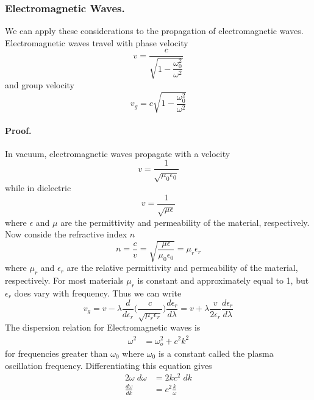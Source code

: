 \documentclass[../../../main.tex]{subfiles}
\begin{document}
\subsubsection{Electromagnetic Waves.} We can apply these considerations to the propagation of electromagnetic waves. Electromagnetic waves travel with phase velocity 
\begin{equation*}
    v=\frac{c}{\sqrt{1-\dfrac{\omega_0^2}{\omega^2}}}
\end{equation*}
and group velocity
\begin{equation*}
    v_g=c \sqrt{1-\frac{\omega_0^2}{\omega^2}}
\end{equation*}

\paragraph{Proof.} In vacuum, electromagnetic waves propagate with a velocity
\begin{equation*}
    v=\frac{1}{\sqrt{\mu_0\epsilon_0}}
\end{equation*}
while in dielectric 
\begin{equation*}
    v=\frac{1}{\sqrt{\mu\epsilon}}
\end{equation*}
where $\epsilon$ and $\mu$ are the permittivity and permeability of the material, respectively. Now conside the refractive index $n$
\begin{equation*}
    n=\frac{c}{v}=\sqrt{\frac{\mu\epsilon}{\mu_0\epsilon_0}}=\mu_r\epsilon_r
\end{equation*}
where $\mu_r$ and $\epsilon_r$ are the relative permittivity and permeability of the material, respectively. For most materials $\mu_r$ is constant and approximately equal to 1, but $\epsilon
_r$ does vary with frequency. Thus we can write 
\begin{equation*}
    v_g=v-\lambda\frac{d}{d\epsilon_r}\biggl(\frac{c}{\sqrt{\mu_r\epsilon_r}}\biggr) \frac{d\epsilon_r}{d\lambda}=v+\lambda\frac{v}{2\epsilon_r}\frac{d\epsilon_r}{d\lambda}
\end{equation*}The dispersion relation for Electromagnetic waves is 
\begin{align*}
    \omega^2&=\omega_o^2+c^2k^2
\end{align*}
for frequencies greater than $\omega_0$ where $\omega_0$ is a constant called the plasma oscillation frequency. Differentiating this equation gives
\begin{align*}
    2\omega\;d\omega&=2kc^2\;dk\\
    \frac{d\omega}{dk}&=c^2\frac{k}{\omega}
\end{align*}
\end{document}
